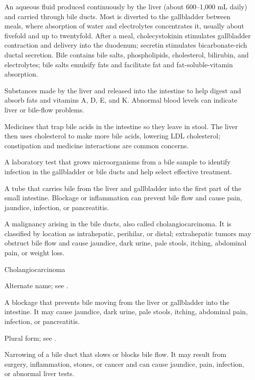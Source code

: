  An aqueous fluid produced continuously by the liver (about 600–1,000 mL daily) and
carried through bile ducts. Most is diverted to the gallbladder between meals, where absorption of
water and electrolytes concentrates it, usually about fivefold and up to twentyfold. After a meal,
cholecystokinin stimulates gallbladder contraction and delivery into the duodenum; secretin stimulates
bicarbonate-rich ductal secretion. Bile contains bile salts, phospholipids, cholesterol, bilirubin, and
electrolytes; bile salts emulsify fats and facilitate fat and fat-soluble-vitamin absorption.

 Substances made by the liver and released into the intestine to help digest and absorb fats and vitamins A, D, E, and K. Abnormal blood levels can indicate liver or bile-flow problems.

 Medicines that trap bile acids in the intestine so they leave in stool. The liver then uses cholesterol to make more bile acids, lowering LDL cholesterol; constipation and medicine interactions are common concerns.

 A laboratory test that grows microorganisms from a bile sample to identify infection in the gallbladder or bile ducts and help select effective treatment.

 A tube that carries bile from the liver and gallbladder into the first part of the small intestine. Blockage or inflammation can prevent bile flow and cause pain, jaundice, infection, or pancreatitis.

 A malignancy arising in the bile ducts, also called cholangiocarcinoma. It is classified by location as intrahepatic, perihilar, or distal; extrahepatic tumors may obstruct bile flow and cause jaundice, dark urine, pale stools, itching, abdominal pain, or weight loss.

\synonyms
Cholangiocarcinoma

 Alternate name; see .

 A blockage that prevents bile moving from the liver or gallbladder into the intestine. It may cause jaundice, dark urine, pale stools, itching, abdominal pain, infection, or pancreatitis.

 Plural form; see .

 Narrowing of a bile duct that slows or blocks bile flow. It may result from surgery, inflammation, stones, or cancer and can cause jaundice, pain, infection, or abnormal liver tests.

